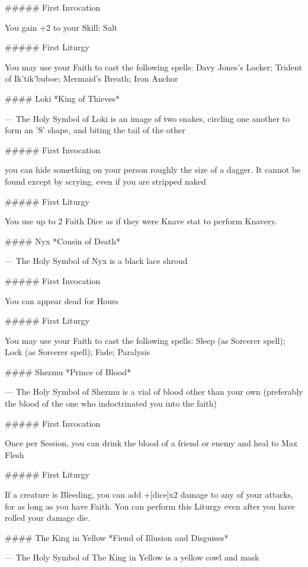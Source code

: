 ##### First Invocation

You gain +2 to your Skill: Salt

##### First Liturgy

You may use your Faith to cast the following spells: Davy Jones's Locker; Trident of Ik'tik'buboe; Mermaid's Breath; Iron Anchor




#### Loki
*King of Thieves*

---
The Holy Symbol of Loki is an image of two snakes, circling one another to form an 'S' shape, and biting the tail of the other

##### First Invocation

you can hide something on your person roughly the size of a dagger. It cannot be found except by scrying, even if you are stripped naked

##### First Liturgy

You use up to 2 Faith Dice as if they were Knave {stat} to perform Knavery.




#### Nyx
*Cousin of Death*

---
The Holy Symbol of Nyx is a black lace shroud

##### First Invocation

You can appear dead for Hours

##### First Liturgy

You may use your Faith to cast the following spells: Sleep (as Sorcerer spell); Lock (as Sorcerer spell); Fade; Paralysis




#### Shezmu
*Prince of Blood*

---
The Holy Symbol of Shezmu is a vial of blood other than your own (preferably the blood of the one who indoctrinated you into the faith)

##### First Invocation

Once per Session, you can drink the blood of a friend or enemy and heal to Max Flesh

##### First Liturgy

If a creature is Bleeding, you can add +[dice]x2 damage to any of your attacks, for as long as you have Faith.  You can perform this Liturgy even after you have rolled your damage die.




#### The King in Yellow
*Fiend of Illusion and Disguises*

---
The Holy Symbol of The King in Yellow is a yellow cowl and mask

